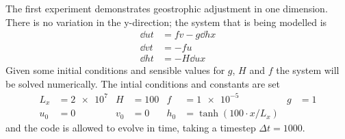 \documentclass[a4paper, sfsidenotes, twoside]{tufte-handout}
\begin{document}
  The first experiment demonstrates geostrophic adjustment in one dimension.
  There is no variation in the y-direction; the system that is being modelled is
  \begin{subequations}
    \begin{align}
      \dd{u}{t} &= fv - g \dd{h}{x} \\
      \dd{v}{t} &= -fu \\
      \dd{h}{t} &= -  H\dd{u}{x}
    \end{align}
  \end{subequations}
  Given some initial conditions and sensible values for $g$, $H$ and $f$ the system will be solved numerically.
  The intial conditions and constants are set
  \begin{align*}
    L_x &= \num{2e7} & H &= \num{100} & f &= \num{1e-5} & g &= \num{1} \\
    u_0 &= 0  & v_0 &= 0 & h_0 &= \tanh(100 \cdot x / L_x)
  \end{align*}
  and the code is allowed to evolve in time, taking a timestep $\Delta t = 1000$.
\end{document}
